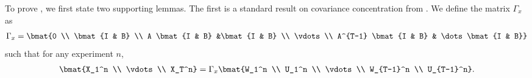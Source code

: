 To prove , we first state two supporting lemmas. The first is a standard result on covariance concentration from \citet{jedra2020finite}. We define the matrix $\Gamma_x$ as 
\begin{align*}
    \Gamma_x = \bmat{0 \\ \bmat{I & B} \\ A \bmat{I & B} &\bmat{I & B} \\ \vdots \\ A^{T-1} \bmat{I & B} & \dots \bmat{I & B}}
\end{align*}
such that for any experiment $n$,
\begin{align*}
    \bmat{X_1^n \\ \vdots \\ X_T^n} = \Gamma_x \bmat{W_1^n \\ U_1^n \\ \vdots \\ W_{T-1}^n \\ U_{T-1}^n}. 
\end{align*}

